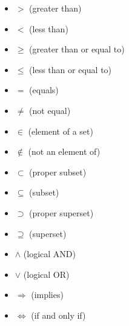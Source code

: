 \begin{itemize}[label=\(-\)]
	\item \(>\)  (greater than)

	\item \(<\)  (less than)

	\item \(\geq\)  (greater than or equal to)

	\item \(\leq\)  (less than or equal to)

	\item \(=\)  (equals)

	\item \(\neq\)  (not equal)

	\item \(\in\)  (element of a set)

	\item \(\notin\)  (not an element of)

	\item \(\subset\)  (proper subset)

	\item \(\subseteq\)  (subset)

	\item \(\supset\)  (proper superset)

	\item \(\supseteq\)  (superset)

	\item \(\land\)  (logical AND)

	\item \(\lor\)  (logical OR)

	\item \(\Rightarrow\)  (implies)

	\item \(\Leftrightarrow\)  (if and only if)
\end{itemize}
